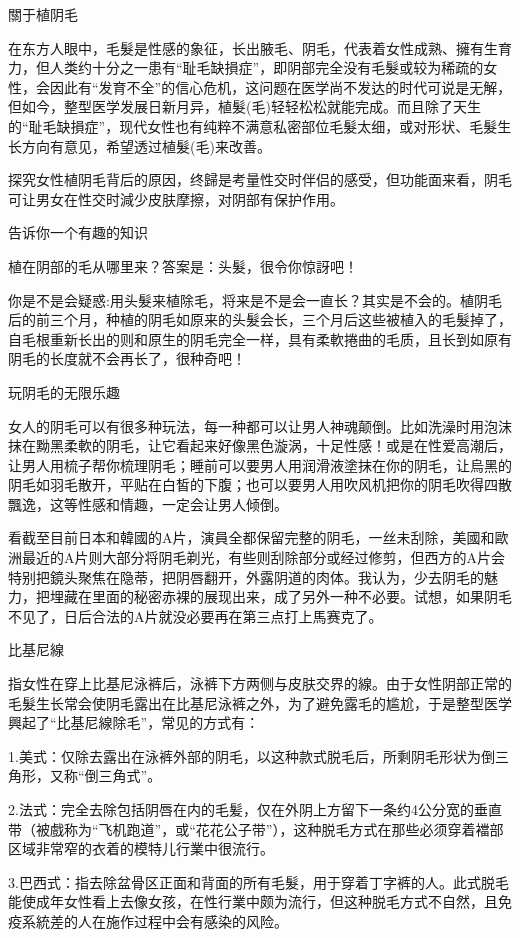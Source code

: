 \documentclass[12pt,UTF8]{ctexbook}
\begin{document}
關于植阴毛

在东方人眼中，毛髮是性感的象征，长出腋毛、阴毛，代表着女性成熟、擁有生育力，但人类约十分之一患有“耻毛缺損症”，即阴部完全没有毛髮或较为稀疏的女性，会因此有“发育不全”的信心危机，这问题在医学尚不发达的时代可说是无解，但如今，整型医学发展日新月异，植髮(毛)轻轻松松就能完成。而且除了天生的“耻毛缺損症”，现代女性也有纯粹不满意私密部位毛髮太细，或对形状、毛髮生长方向有意见，希望透过植髮(毛)来改善。

探究女性植阴毛背后的原因，终歸是考量性交时伴侣的感受，但功能面来看，阴毛可让男女在性交时減少皮肤摩擦，对阴部有保护作用。

告诉你一个有趣的知识

植在阴部的毛从哪里来？答案是：头髮，很令你惊訝吧！

你是不是会疑惑:用头髮来植除毛，将来是不是会一直长？其实是不会的。植阴毛后的前三个月，种植的阴毛如原来的头髮会长，三个月后这些被植入的毛髮掉了，自毛根重新长出的则和原生的阴毛完全一样，具有柔軟捲曲的毛质，且长到如原有阴毛的长度就不会再长了，很种奇吧！

玩阴毛的无限乐趣

女人的阴毛可以有很多种玩法，每一种都可以让男人神魂颠倒。比如洗澡时用泡沫抹在黝黑柔軟的阴毛，让它看起来好像黑色漩涡，十足性感！或是在性爱高潮后，让男人用梳子帮你梳理阴毛；睡前可以要男人用润滑液塗抹在你的阴毛，让烏黑的阴毛如羽毛散开，平贴在白皙的下腹；也可以要男人用吹风机把你的阴毛吹得四散飄逸，这等性感和情趣，一定会让男人倾倒。

看截至目前日本和韓國的A片，演員全都保留完整的阴毛，一丝未刮除，美國和歐洲最近的A片则大部分将阴毛剃光，有些则刮除部分或经过修剪，但西方的A片会特别把鏡头聚焦在隐蒂，把阴唇翻开，外露阴道的肉体。我认为，少去阴毛的魅力，把埋藏在里面的秘密赤裸的展现出来，成了另外一种不必要。试想，如果阴毛不见了，日后合法的A片就没必要再在第三点打上馬赛克了。

比基尼線

指女性在穿上比基尼泳裤后，泳裤下方两侧与皮肤交界的線。由于女性阴部正常的毛髮生长常会使阴毛露出在比基尼泳裤之外，为了避免露毛的尴尬，于是整型医学興起了“比基尼線除毛”，常见的方式有：

1.美式：仅除去露出在泳裤外部的阴毛，以这种款式脱毛后，所剩阴毛形状为倒三角形，又称“倒三角式”。

2.法式：完全去除包括阴唇在内的毛髪，仅在外阴上方留下一条约4公分宽的垂直带（被戲称为“飞机跑道”，或“花花公子带”），这种脱毛方式在那些必须穿着襠部区域非常窄的衣着的模特儿行業中很流行。

3.巴西式：指去除盆骨区正面和背面的所有毛髮，用于穿着丁字裤的人。此式脱毛能使成年女性看上去像女孩，在性行業中颇为流行，但这种脱毛方式不自然，且免疫系統差的人在施作过程中会有感染的风险。
\end{document}
